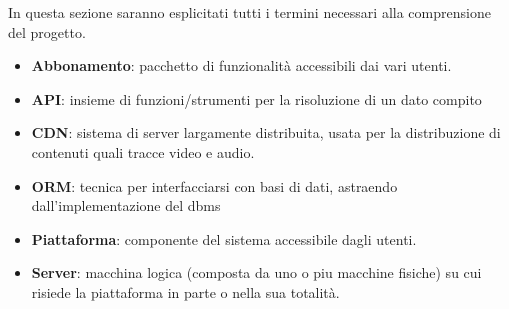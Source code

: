  In questa sezione saranno esplicitati tutti i termini necessari alla comprensione del progetto.

\begin{itemize}
	\item \textbf{Abbonamento}: pacchetto di funzionalità accessibili dai vari utenti.
	\item \textbf{API}: insieme di funzioni/strumenti per la risoluzione di un dato compito
	\item \textbf{CDN}: sistema di server largamente distribuita, usata per la distribuzione di contenuti quali tracce video e audio.
	\item \textbf{ORM}: tecnica per interfacciarsi con basi di dati, astraendo dall'implementazione del dbms 
	\item \textbf{Piattaforma}: componente del sistema accessibile dagli utenti.
	\item \textbf{Server}: macchina logica (composta da uno o piu macchine fisiche) su cui risiede la piattaforma in parte o nella sua totalità.
\end{itemize}
